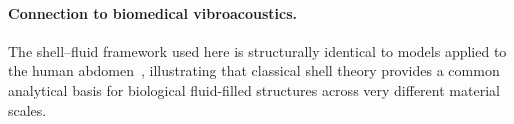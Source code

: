
\paragraph{Connection to biomedical vibroacoustics.}
The shell--fluid framework used here is structurally identical to
models applied to the human abdomen~\cite{JungerFeit1972}, illustrating
that classical shell theory provides a common analytical basis for
biological fluid-filled structures across very different material scales.
